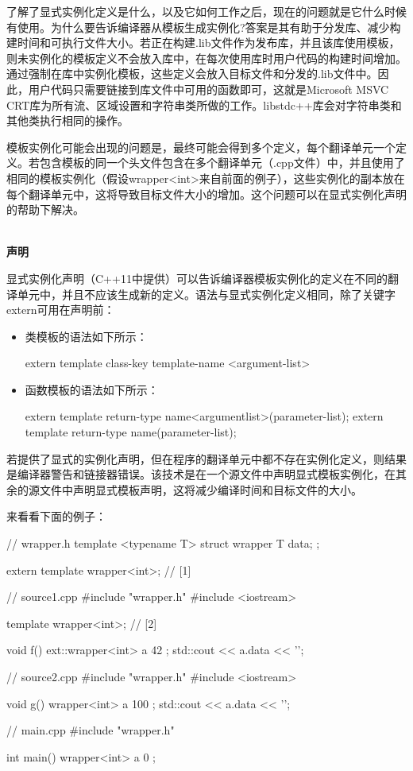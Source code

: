 了解了显式实例化定义是什么，以及它如何工作之后，现在的问题就是它什么时候有使用。为什么要告诉编译器从模板生成实例化?答案是其有助于分发库、减少构建时间和可执行文件大小。若正在构建.lib文件作为发布库，并且该库使用模板，则未实例化的模板定义不会放入库中，在每次使用库时用户代码的构建时间增加。通过强制在库中实例化模板，这些定义会放入目标文件和分发的.lib文件中。因此，用户代码只需要链接到库文件中可用的函数即可，这就是Microsoft MSVC CRT库为所有流、区域设置和字符串类所做的工作。libstdc++库会对字符串类和其他类执行相同的操作。

模板实例化可能会出现的问题是，最终可能会得到多个定义，每个翻译单元一个定义。若包含模板的同一个头文件包含在多个翻译单元（.cpp文件）中，并且使用了相同的模板实例化（假设wrapper<int>来自前面的例子），这些实例化的副本放在每个翻译单元中，这将导致目标文件大小的增加。这个问题可以在显式实例化声明的帮助下解决。

\hspace*{\fill} \\ %
\noindent\textbf{声明}

显式实例化声明（C++11中提供）可以告诉编译器模板实例化的定义在不同的翻译单元中，并且不应该生成新的定义。语法与显式实例化定义相同，除了关键字extern可用在声明前：

\begin{itemize}
\item 
类模板的语法如下所示：
\begin{cpp}
extern template class-key template-name <argument-list>
\end{cpp}

\item 
函数模板的语法如下所示：
\begin{cpp}
extern template return-type name<argumentlist>(parameter-list);
extern template return-type name(parameter-list);
\end{cpp}
\end{itemize}

若提供了显式的实例化声明，但在程序的翻译单元中都不存在实例化定义，则结果是编译器警告和链接器错误。该技术是在一个源文件中声明显式模板实例化，在其余的源文件中声明显式模板声明，这将减少编译时间和目标文件的大小。

来看看下面的例子：

\begin{cpp}
// wrapper.h
template <typename T>
struct wrapper
{
	T data;
};

extern template wrapper<int>; // [1]

// source1.cpp
#include "wrapper.h"
#include <iostream>

template wrapper<int>; // [2]

void f()
{
	ext::wrapper<int> a{ 42 };
	std::cout << a.data << '\n';
}

// source2.cpp
#include "wrapper.h"
#include <iostream>

void g()
{
	wrapper<int> a{ 100 };
	std::cout << a.data << '\n';
}

// main.cpp
#include "wrapper.h"

int main()
{
	wrapper<int> a{ 0 };
}
\end{cpp}

